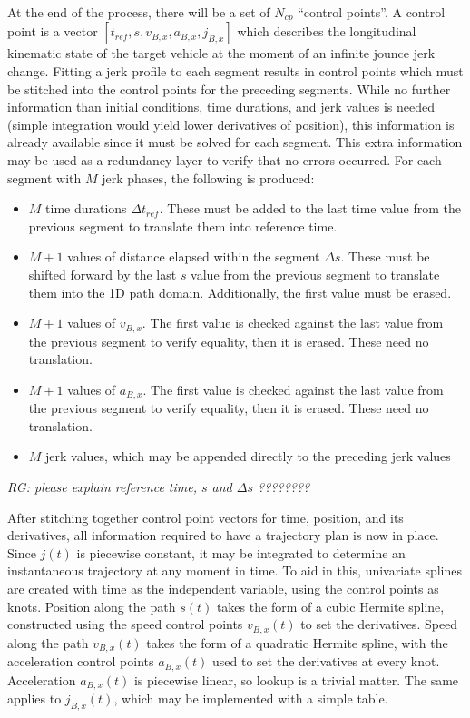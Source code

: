 \documentclass[letterpaper, 10 pt, conference]{ieeeconf}  %
\begin{document}
At the end of the process, there will be a set of $N_{cp}$ ``control points''.
A control point is a vector $[t_{ref}, s, v_{B,x}, a_{B,x}, j_{B,x}]$ which describes the longitudinal kinematic state of the target vehicle at the moment of an infinite jounce jerk change.
Fitting a jerk profile to each segment results in control points which must be stitched into the control points for the preceding segments.
While no further information than initial conditions, time durations, and jerk values is needed (simple integration would yield lower derivatives of position), this information is already available since it must be solved for each segment.
This extra information may be used as a redundancy layer to verify that no errors occurred.
For each segment with $M$ jerk phases, the following is produced:
\begin{itemize}
  \item $M$ time durations $\Delta t_{ref}$. These must be added to the last time value from the previous segment to translate them into reference time.
  \item $M+1$ values of distance elapsed within the segment $\Delta s$. These must be shifted forward by the last $s$ value from the previous segment to translate them into the 1D path domain. Additionally, the first value must be erased.
  \item $M+1$ values of $v_{B,x}$. The first value is checked against the last value from the previous segment to verify equality, then it is erased. These need no translation.
  \item $M+1$ values of $a_{B,x}$. The first value is checked against the last value from the previous segment to verify equality, then it is erased. These need no translation.
  \item $M$ jerk values, which may be appended directly to the preceding jerk values
\end{itemize}

\emph{RG: please explain reference time, $s$ and $\Delta s$ ????????}

After stitching together control point vectors for time, position, and its derivatives, all information required to have a trajectory plan is now in place.
Since $j(t)$ is piecewise constant, it may be integrated to determine an instantaneous trajectory at any moment in time.
To aid in this, univariate splines are created with time as the independent variable, using the control points as knots.
Position along the path $s(t)$ takes the form of a cubic Hermite spline, constructed using the speed control points $v_{B,x}(t)$ to set the derivatives.
Speed along the path $v_{B,x}(t)$ takes the form of a quadratic Hermite spline, with the acceleration control points $a_{B,x}(t)$ used to set the derivatives at every knot.
Acceleration $a_{B,x}(t)$ is piecewise linear, so lookup is a trivial matter.
The same applies to $j_{B,x}(t)$, which may be implemented with a simple table.
\end{document}
